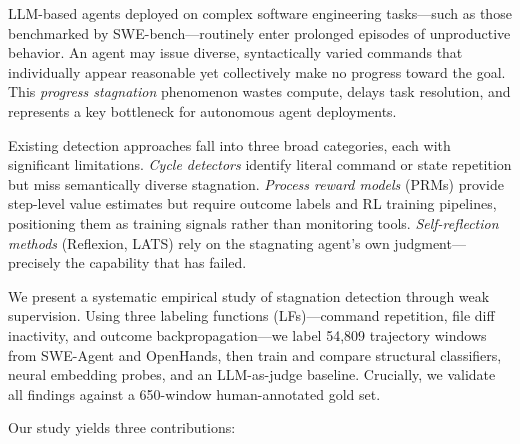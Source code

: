 \documentclass[11pt]{article}
\begin{document}
LLM-based agents deployed on complex software engineering tasks---such as those benchmarked by SWE-bench---routinely enter prolonged episodes of unproductive behavior. An agent may issue diverse, syntactically varied commands that individually appear reasonable yet collectively make no progress toward the goal. This \emph{progress stagnation} phenomenon wastes compute, delays task resolution, and represents a key bottleneck for autonomous agent deployments.

Existing detection approaches fall into three broad categories, each with significant limitations. \emph{Cycle detectors} identify literal command or state repetition but miss semantically diverse stagnation. \emph{Process reward models} (PRMs) provide step-level value estimates but require outcome labels and RL training pipelines, positioning them as training signals rather than monitoring tools. \emph{Self-reflection methods} (Reflexion, LATS) rely on the stagnating agent's own judgment---precisely the capability that has failed.

We present a systematic empirical study of stagnation detection through weak supervision. Using three labeling functions (LFs)---command repetition, file diff inactivity, and outcome backpropagation---we label 54,809 trajectory windows from SWE-Agent and OpenHands, then train and compare structural classifiers, neural embedding probes, and an LLM-as-judge baseline. Crucially, we validate all findings against a 650-window human-annotated gold set.

Our study yields three contributions:
\end{document}
